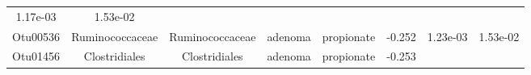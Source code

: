 \documentclass[11pt,]{article}
\begin{document}
\begin{longtable}[]{@{}cccccccc@{}}
\begin{minipage}[t]{0.08\columnwidth}
1.17e-03\strut
\end{minipage} & \begin{minipage}[t]{0.08\columnwidth}\centering\strut
1.53e-02\strut
\end{minipage}\tabularnewline
\begin{minipage}[t]{0.08\columnwidth}\centering\strut
Otu00536\strut
\end{minipage} & \begin{minipage}[t]{0.15\columnwidth}\centering\strut
Ruminococcaceae\strut
\end{minipage} & \begin{minipage}[t]{0.15\columnwidth}\centering\strut
Ruminococcaceae\strut
\end{minipage} & \begin{minipage}[t]{0.08\columnwidth}\centering\strut
adenoma\strut
\end{minipage} & \begin{minipage}[t]{0.09\columnwidth}\centering\strut
propionate\strut
\end{minipage} & \begin{minipage}[t]{0.07\columnwidth}\centering\strut
-0.252\strut
\end{minipage} & \begin{minipage}[t]{0.08\columnwidth}\centering\strut
1.23e-03\strut
\end{minipage} & \begin{minipage}[t]{0.08\columnwidth}\centering\strut
1.53e-02\strut
\end{minipage}\tabularnewline
\begin{minipage}[t]{0.08\columnwidth}\centering\strut
Otu01456\strut
\end{minipage} & \begin{minipage}[t]{0.15\columnwidth}\centering\strut
Clostridiales\strut
\end{minipage} & \begin{minipage}[t]{0.15\columnwidth}\centering\strut
Clostridiales\strut
\end{minipage} & \begin{minipage}[t]{0.08\columnwidth}\centering\strut
adenoma\strut
\end{minipage} & \begin{minipage}[t]{0.09\columnwidth}\centering\strut
propionate\strut
\end{minipage} & \begin{minipage}[t]{0.07\columnwidth}\centering\strut
-0.253\strut
\end{minipage} & \begin{minipage}[t]{0.08\columnwidth}\centering\strut

\end{minipage}
\end{longtable}
\end{document}
